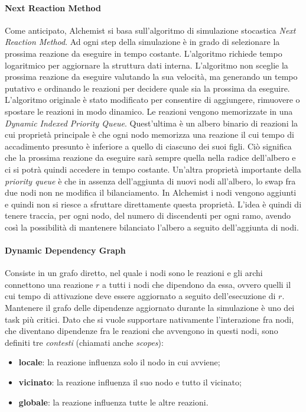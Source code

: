 \documentclass[12pt,a4paper,openright,twoside]{book}
\begin{document}
\paragraph{Next Reaction Method}
\label{sec:next-reaction-method}
Come anticipato, Alchemist si basa sull'algoritmo di simulazione stocastica \textit{Next Reaction Method}. Ad ogni step della simulazione è in grado di selezionare la prossima reazione da eseguire in tempo costante. L'algoritmo richiede tempo logaritmico per aggiornare la struttura dati interna. L'algoritmo non sceglie la prossima reazione da eseguire valutando la sua velocità, ma generando un tempo putativo e ordinando le reazioni per decidere quale sia la prossima da eseguire. L'algoritmo originale è stato modificato per consentire di aggiungere, rimuovere o spostare le reazioni in modo dinamico. 
Le reazioni vengono memorizzate in una \textit{Dynamic Indexed Priority Queue}. Quest'ultima è un albero binario di reazioni la cui proprietà principale è che ogni nodo memorizza una reazione il cui tempo di accadimento presunto è inferiore a quello di ciascuno dei suoi figli. Ciò significa che la prossima reazione da eseguire sarà sempre quella nella radice dell'albero e ci si potrà quindi accedere in tempo costante. 
Un'altra proprietà importante della \textit{priority queue} è che in assenza dell'aggiunta di nuovi nodi all'albero, lo swap fra due nodi non ne modifica il bilanciamento. 
In Alchemist i nodi vengono aggiunti e quindi non si riesce a sfruttare direttamente questa proprietà. L'idea è quindi di tenere traccia, per ogni nodo, del numero di discendenti per ogni ramo, avendo così la possibilità di mantenere bilanciato l'albero a seguito dell'aggiunta di nodi. 

\paragraph{Dynamic Dependency Graph}
Consiste in un grafo diretto, nel quale i nodi sono le reazioni e gli archi connettono una reazione $r$ a tutti i nodi che dipendono da essa, ovvero quelli il cui tempo di attivazione deve essere aggiornato a seguito dell'esecuzione di $r$. 
Mantenere il grafo delle dipendenze aggiornato durante la simulazione è uno dei task più critici. Dato che si vuole supportare nativamente l'interazione fra nodi, che diventano dipendenze fra le reazioni che avvengono in questi nodi, sono definiti tre \textit{contesti} (chiamati anche \textit{scopes}): 
\begin{itemize}
    \item \textbf{locale}: la reazione influenza solo il nodo in cui avviene; 
    \item \textbf{vicinato}: la reazione influenza il suo nodo e tutto il vicinato; 
    \item \textbf{globale}: la reazione influenza tutte le altre reazioni. 
\end{itemize}
\end{document}
